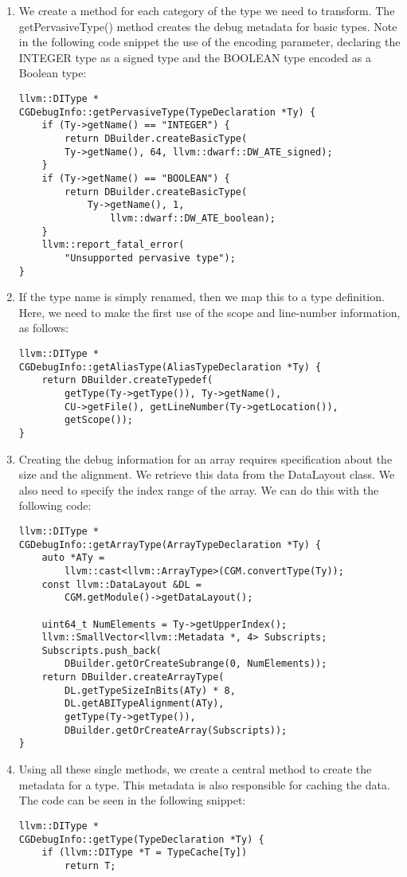 \begin{enumerate}
\item We create a method for each category of the type we need to transform. The getPervasiveType() method creates the debug metadata for basic types. Note in the following code snippet the use of the encoding parameter, declaring the INTEGER type as a signed type and the BOOLEAN type encoded as a Boolean type:
\begin{lstlisting}[caption={}]
llvm::DIType *
CGDebugInfo::getPervasiveType(TypeDeclaration *Ty) {
	if (Ty->getName() == "INTEGER") {
		return DBuilder.createBasicType(
		Ty->getName(), 64, llvm::dwarf::DW_ATE_signed);
	}
	if (Ty->getName() == "BOOLEAN") {
		return DBuilder.createBasicType(
			Ty->getName(), 1, 
				llvm::dwarf::DW_ATE_boolean);
	}
	llvm::report_fatal_error(
		"Unsupported pervasive type");
}
\end{lstlisting}

\item If the type name is simply renamed, then we map this to a type definition. Here, we need to make the first use of the scope and line-number information, as follows:
\begin{lstlisting}[caption={}]
llvm::DIType *
CGDebugInfo::getAliasType(AliasTypeDeclaration *Ty) {
	return DBuilder.createTypedef(
		getType(Ty->getType()), Ty->getName(),
		CU->getFile(), getLineNumber(Ty->getLocation()),
		getScope());
}
\end{lstlisting}

\item Creating the debug information for an array requires specification about the size and the alignment. We retrieve this data from the DataLayout class. We also need to specify the index range of the array. We can do this with the following code:
\begin{lstlisting}[caption={}]
llvm::DIType *
CGDebugInfo::getArrayType(ArrayTypeDeclaration *Ty) {
	auto *ATy =
		llvm::cast<llvm::ArrayType>(CGM.convertType(Ty));
	const llvm::DataLayout &DL =
		CGM.getModule()->getDataLayout();
		
	uint64_t NumElements = Ty->getUpperIndex();
	llvm::SmallVector<llvm::Metadata *, 4> Subscripts;
	Subscripts.push_back(
		DBuilder.getOrCreateSubrange(0, NumElements));
	return DBuilder.createArrayType(
		DL.getTypeSizeInBits(ATy) * 8,
		DL.getABITypeAlignment(ATy),
		getType(Ty->getType()),
		DBuilder.getOrCreateArray(Subscripts));
}
\end{lstlisting}

\item Using all these single methods, we create a central method to create the metadata for a type. This metadata is also responsible for caching the data. The code can be seen in the following snippet:
\begin{lstlisting}[caption={}]
llvm::DIType *
CGDebugInfo::getType(TypeDeclaration *Ty) {
	if (llvm::DIType *T = TypeCache[Ty])
		return T;
	

\end{lstlisting}
\end{enumerate}
